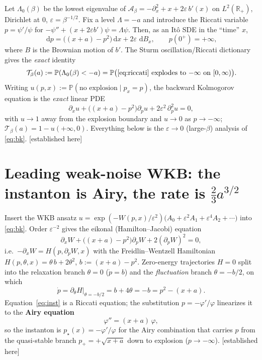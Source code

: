 \documentclass[11pt,reqno]{amsart}
\theoremstyle{plain}
\theoremstyle{remark}
\newcommand{\dd}{\,\mathrm{d}}
\newcommand{\R}{\mathbb{R}}
\newcommand{\Prob}{\mathbb{P}}
\newcommand{\eps}{\varepsilon}
\newcommand{\OK}{{\footnotesize\textsf{[established here]}}}
\begin{document}
Let $\Lambda_0(\beta)$ be the lowest eigenvalue of $\mathcal A_\beta=-\partial_x^2+x+2\eps\,b'(x)$
on $L^2(\R_+)$, Dirichlet at $0$, $\eps=\beta^{-1/2}$. Fix a level $\Lambda=-a$ and introduce the
Riccati variable $p=\psi'/\psi$ for $-\psi''+(x+2\eps b')\psi=\Lambda\psi$. Then, as an It\^o SDE
in the ``time'' $x$,
\begin{equation}\label{eq:riccati}
\dd p=\bigl((x+a)-p^2\bigr)\dd x+2\eps\,\dd B_x,\qquad p(0^+)=+\infty,
\end{equation}
where $B$ is the Brownian motion of $b'$. The Sturm oscillation/Riccati dictionary gives the
\emph{exact} identity
\begin{equation}\label{eq:tail}
\mathcal T_\beta(a):=\Prob(\Lambda_0(\beta)<-a)=\Prob\bigl(\text{\eqref{eq:riccati} explodes to
$-\infty$ on $[0,\infty)$}\bigr).
\end{equation}
Writing $u(p,x):=\Prob(\text{no explosion}\mid p_x=p)$, the backward Kolmogorov equation is the
\emph{exact} linear PDE
\begin{equation}\label{eq:bk}
\partial_x u+\bigl((x+a)-p^2\bigr)\partial_p u+2\eps^2\,\partial_p^2 u=0,
\end{equation}
with $u\to1$ away from the explosion boundary and $u\to0$ as $p\to-\infty$; $\mathcal
T_\beta(a)=1-u(+\infty,0)$. Everything below is the $\eps\to0$ (large-$\beta$) analysis of
\eqref{eq:bk}. \OK

\section{Leading weak-noise WKB: the instanton is Airy, the rate is $\tfrac23a^{3/2}$}

Insert the WKB ansatz $u=\exp(-W(p,x)/\eps^2)\bigl(A_0+\eps^2A_1+\eps^4A_2+\cdots\bigr)$ into
\eqref{eq:bk}. Order $\eps^{-2}$ gives the eikonal (Hamilton--Jacobi) equation
\begin{equation}\label{eq:hj}
\partial_x W+\bigl((x+a)-p^2\bigr)\partial_p W+2(\partial_p W)^2=0,
\end{equation}
i.e.\ $-\partial_x W=H(p,\partial_pW,x)$ with the Freidlin--Wentzell Hamiltonian
$H(p,\theta,x)=\theta\,b+2\theta^2$, $b:=(x+a)-p^2$. Zero-energy trajectories $H=0$ split into the
relaxation branch $\theta=0$ ($\dot p=b$) and the \emph{fluctuation} branch $\theta=-b/2$, on
which
\begin{equation}\label{eq:inst}
\dot p=\partial_\theta H\big|_{\theta=-b/2}=b+4\theta=-b=p^2-(x+a).
\end{equation}
Equation~\eqref{eq:inst} is a Riccati equation; the substitution $p=-\varphi'/\varphi$ linearizes
it to the \textbf{Airy equation}
\begin{equation}\label{eq:airy}
\varphi''=(x+a)\,\varphi,
\end{equation}
so the instanton is $p_\star(x)=-\varphi'/\varphi$ for the Airy combination that carries $p$ from
the quasi-stable branch $p_+=+\sqrt{x+a}$ down to explosion ($p\to-\infty$). \OK
\end{document}
